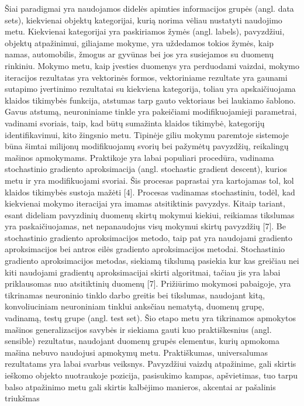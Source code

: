 \documentclass{VUMIFInfBakalaurinis}
\begin{document}
Šiai paradigmai yra naudojamos didelės apimties informacijos grupės (angl. data sets), kiekvienai objektų kategorijai, kurią norima vėliau nustatyti naudojimo metu. Kiekvienai kategorijai yra paskiriamos žymės (angl. labels), pavyzdžiui, objektų atpažinimui, giliajame mokyme, yra uždedamos tokios žymės, kaip namas, automobilis, žmogus ar gyvūnas bei jos yra susiejamos su duomenų rinkiniu. Mokymo metu, kaip įvesties duomenys yra perduodami vaizdai, mokymo iteracijos rezultatas yra vektorinės formos, vektoriniame rezultate yra gaunami sutapimo įvertinimo rezultatai su kiekviena kategorija, toliau yra apskaičiuojama klaidos tikimybės funkcija, atstumas tarp gauto vektoriaus bei laukiamo šablono. Gavus atstumą, neuroniniame tinkle yra pakeičiami modifikuojamieji parametrai, vadinami svoriais, taip, kad būtų sumažinta klaidos tikimybė, kategorijų identifikavimui, kito žingsnio metu. Tipinėje giliu mokymu paremtoje sistemoje būna šimtai milijonų modifikuojamų svorių bei pažymėtų pavyzdžių, reikalingų mašinos apmokymams. Praktikoje yra labai populiari procedūra, vadinama stochastinio gradiento aproksimacija (angl. stochastic gradient descent), kurios metu ir yra modifikuojami svoriai. Šis procesas paprastai yra kartojamas tol, kol klaidos tikimybės sustoja mažėti [4]. Procesas vadinamas stochastiniu, todėl, kad kiekvienai mokymo iteracijai yra imamas atsitiktinis pavyzdys. Kitaip tariant, esant dideliam pavyzdinių duomenų skirtų mokymui kiekiui, reikiamas tikslumas yra paskaičiuojamas, net nepanaudojus visų mokymui skirtų pavyzdžių [7]. Be stochastinio gradiento aproksimacijos metodo, taip pat yra naudojami gradiento aproksimacijos bei antros eilės gradiento aproksimacijos metodai. Stochastinio gradiento aproksimacijos metodas, siekiamą tikslumą pasiekia kur kas greičiau nei kiti naudojami gradientų aproksimacijai skirti algoritmai, tačiau jis yra labai priklausomas nuo atsitiktinių duomenų [7].  Prižiūrimo mokymosi pabaigoje, yra tikrinamas neuroninio tinklo darbo greitis bei tikslumas, naudojant kitą, konvoliuciniam neuroniniam tinklui anksčiau nematytą, duomenų grupę, vadinamą, testų grupe (angl. test set). Šio etapo metu yra tikrinamos apmokytos mašinos generalizacijos savybės ir siekiama gauti kuo praktiškesnius (angl. sensible) rezultatus, naudojant duomenų grupės elementus, kurių apmokoma mašina nebuvo naudojusi apmokymų metu. Praktiškumas, universalumas rezultatams yra labai svarbus veiksnys. Pavyzdžiui vaizdų atpažinime, gali skirtis ieškomo objekto nuotraukoje pozicija, pasisukimo kampas, apšvietimas, tuo tarpu balso atpažinimo metu gali skirtis kalbėjimo manieros, akcentai ar pašalinis triukšmas
\end{document}
